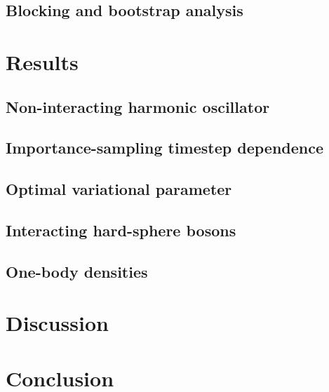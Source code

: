 \documentclass[11pt,a4paper]{article}
\begin{document}
\subsection{Blocking and bootstrap analysis}

\section{Results}

\subsection{Non-interacting harmonic oscillator}

\subsection{Importance-sampling timestep dependence}

\subsection{Optimal variational parameter}

\subsection{Interacting hard-sphere bosons}

\subsection{One-body densities}

\section{Discussion}

\section{Conclusion}



\end{document}
